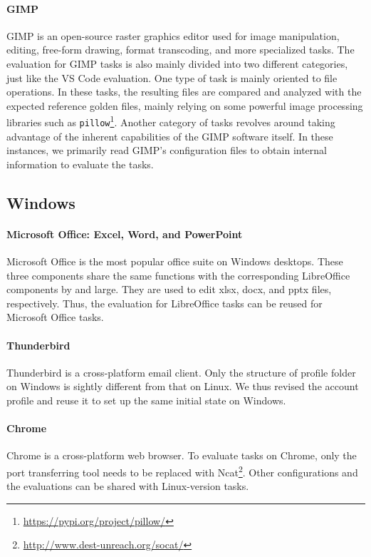 \paragraph{GIMP}
GIMP is an open-source raster graphics editor used for image manipulation, editing, free-form drawing, format transcoding, and more specialized tasks. 
The evaluation for GIMP tasks is also mainly divided into two different categories, just like the VS Code evaluation. 
One type of task is mainly oriented to file operations.
In these tasks, the resulting files are compared and analyzed with the expected reference golden files, mainly relying on some powerful image processing libraries such as \verb|pillow|\footnote{\url{https://pypi.org/project/pillow/}}. 
Another category of tasks revolves around taking advantage of the inherent capabilities of the GIMP software itself. 
In these instances, we primarily read GIMP's configuration files to obtain internal information to evaluate the tasks.


\subsection{Windows}

\paragraph{Microsoft Office: Excel, Word, and PowerPoint} Microsoft Office is the most
popular office suite on Windows desktops. These three components share the same functions
with the corresponding LibreOffice components by and large. They are used to edit xlsx, docx,
and pptx files, respectively. Thus, the evaluation for LibreOffice tasks can be reused
for Microsoft Office tasks.

\paragraph{Thunderbird} Thunderbird is a cross-platform email client. Only the 
structure of profile folder on Windows is sightly
different from that on Linux. We thus revised the account profile and reuse it to 
set up the same initial state on Windows.

\paragraph{Chrome} Chrome is a cross-platform web browser. To evaluate tasks on 
Chrome, only the port transferring tool needs to be replaced with 
Ncat\footnote{\url{http://www.dest-unreach.org/socat/}}. Other configurations and the
evaluations can be shared with Linux-version tasks.


